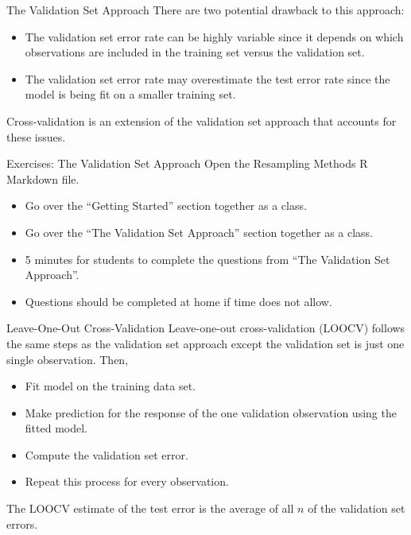 \documentclass[
  ignorenonframetext,
  aspectratio=169,
]{beamer}
\begin{document}
\begin{frame}{The Validation Set Approach}
\protect\hypertarget{the-validation-set-approach-1}{}
There are two potential drawback to this approach:

\begin{itemize}
\item
  The \alert{validation set error rate can be highly variable} since it
  depends on which observations are included in the training set versus
  the validation set.
\item
  The validation set error rate may
  \alert{overestimate the test error rate} since the model is being fit
  on a smaller training set.
\end{itemize}

Cross-validation is an extension of the validation set approach that
accounts for these issues.
\end{frame}

\begin{frame}{Exercises: The Validation Set Approach}
\protect\hypertarget{exercises-the-validation-set-approach}{}
Open the Resampling Methods R Markdown file.

\begin{itemize}
\item
  Go over the ``Getting Started'' section together as a class.
\item
  Go over the ``The Validation Set Approach'' section together as a
  class.
\item
  5 minutes for students to complete the questions from ``The Validation
  Set Approach''.
\item
  Questions should be completed at home if time does not allow.
\end{itemize}
\end{frame}

\begin{frame}{Leave-One-Out Cross-Validation}
\protect\hypertarget{leave-one-out-cross-validation}{}
Leave-one-out cross-validation (LOOCV) follows the same steps as the
validation set approach except the
\alert{validation set is just one single observation}. Then,

\begin{itemize}
\item
  Fit model on the training data set.
\item
  Make prediction for the response of the one validation observation
  using the fitted model.
\item
  Compute the validation set error.
\item
  Repeat this process for every observation.
\end{itemize}

The LOOCV estimate of the test error is the average of all \(n\) of the
validation set errors.
\end{frame}
\end{document}
